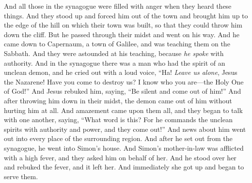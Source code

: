 \begin{biblechapter}
\verse And all those in the synagogue were filled with anger when they heard these things.
\verse And they stood up and forced him out of the town and brought him up to the edge of the hill on which their town was built, so that they could throw him down the cliff.
\verse But he passed through their midst and went on his way.
 And he came down to Capernaum, a town of Galilee, and was teaching them on the Sabbath.
\verse And they were astounded at his teaching, because \textit{he spoke} with authority.
\verse And in the synagogue there was a man who had the spirit of an unclean demon, and he cried out with a loud voice,
\verse “Ha! \textit{Leave us alone}, Jesus the Nazarene! Have you come to destroy us? I know who you are—the Holy One of God!”
\verse And Jesus rebuked him, saying, “Be silent and come out of him!” And after throwing him down in their midst, the demon came out of him without hurting him at all.
\verse And amazement came upon them all, and they began to talk with one another, saying, “What word is this? For he commands the unclean spirits with authority and power, and they come out!”
\verse And news about him went out into every place of the surrounding region.
\verse And after he set out from the synagogue, he went into Simon’s house. And Simon’s mother-in-law was afflicted with a high fever, and they asked him on behalf of her.
\verse And he stood over her and rebuked the fever, and it left her. And immediately she got up and began to serve them.

\end{biblechapter}
